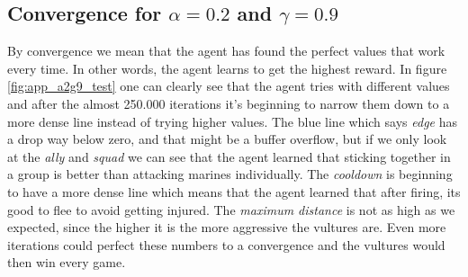 
\subsection*{Convergence for $\alpha= 0.2$ and $\gamma = 0.9$}

By convergence we mean that the agent has found the perfect values that work every time. In other words, the agent learns to get the highest reward. In figure \ref{fig:app_a2g9_test} one can clearly see that the agent tries with different values and after the almost 250.000 iterations it's beginning to narrow them down to a more dense line instead of trying higher values. The blue line which says \textit{edge} has a drop way below zero, and that might be a buffer overflow, but if we only look at the \textit{ally} and \textit{squad} we can see that the agent learned that sticking together in a group is better than attacking marines individually. The \textit{cooldown} is beginning to have a more dense line which means that the agent learned that after firing, its good to flee to avoid getting injured. The \textit{maximum distance} is not as high as we expected, since the higher it is the more aggressive the vultures are. Even more iterations could perfect these numbers to a convergence and the vultures would then win every game. 


